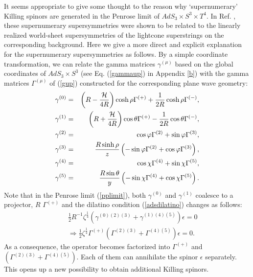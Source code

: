 \documentclass[a4paper,12pt]{article}
\begin{document}
It seems appropriate to give some thought to the reason 
why `supernumerary' Killing spinors are generated in the Penrose limit of 
$AdS_3\times S^3\times T^4$. In Ref. \cite{cvetic}, these supernumerary 
supersymmetries were shown to be related to the linearly realized world-sheet 
supersymmetries of the lightcone superstrings on the corresponding background. 
Here we give a more direct and explicit explanation for the supernumerary 
supersymmetries as follows. By a simple coordinate transformation, we can 
relate the gamma matrices $\gamma^{(\mu)}$ based on the global coordinates 
of $AdS_3\times S^3$ (see Eq. (\ref{gammaup}) in Appendix \ref{b}) with the 
gamma matrices $\Gamma^{(\mu)}$ of (\ref{gup}) constructed for the 
corresponding plane wave geometry:
\begin{eqnarray}
\gamma^{(0)}&=&\left(R-\frac{\cal H}{4R}\right)\cosh{\rho}\Gamma^{(+)}+\frac{1}{2R}\cosh{\rho}\Gamma^{(-)},\nonumber\\
\gamma^{(1)}&=&\left(R+\frac{\cal H}{4R}\right)\cos{\theta}\Gamma^{(+)}-\frac{1}{2R}\cos{\theta}\Gamma^{(-)},\nonumber\\
\gamma^{(2)}&=&\cos{\varphi}\Gamma^{(2)}+\sin{\varphi}\Gamma^{(3)},\nonumber\\
\gamma^{(3)}&=&\frac{R\sinh{\rho}}{z}\left(-\sin{\varphi}\Gamma^{(2)}+\cos{\varphi}\Gamma^{(3)}\right),\nonumber\\
\gamma^{(4)}&=&\cos{\chi}\Gamma^{(4)}+\sin{\chi}\Gamma^{(5)},\nonumber\\
\gamma^{(5)}&=&\frac{R\sin{\theta}}{y}\left(-\sin{\chi}\Gamma^{(4)}+\cos{\chi}\Gamma^{(5)}\right).
\end{eqnarray} 
Note that in the Penrose limit (\ref{pplimit}), both $\gamma^{(0)}$ and 
$\gamma^{(1)}$ coalesce to a projector, $R\,\,\Gamma^{(+)}$ and the dilatino 
condition (\ref{adsdilatino}) changes as follows:
\begin{eqnarray}
&&\frac{1}{2}R^{-1}\zeta^{\frac{1}{4}}\left(\gamma^{(0)(2)(3)}+\gamma^{(1)(4)(5)}\right)\epsilon=0\nonumber\\
&&\Longrightarrow \frac{1}{2}\zeta^{\frac{1}{4}}\Gamma^{(+)}\left(\Gamma^{(2)(3)}+\Gamma^{(4)(5)}\right)\epsilon=0.
\end{eqnarray}
As a consequence, the operator becomes factorized into $\Gamma^{(+)}$ and $\left(\Gamma^{(2)(3)}+\Gamma^{(4)(5)}\right)$. Each of them can annihilate 
the spinor $\epsilon$ separately. This opens up a new possibility 
to obtain additional Killing spinors.
\end{document}
